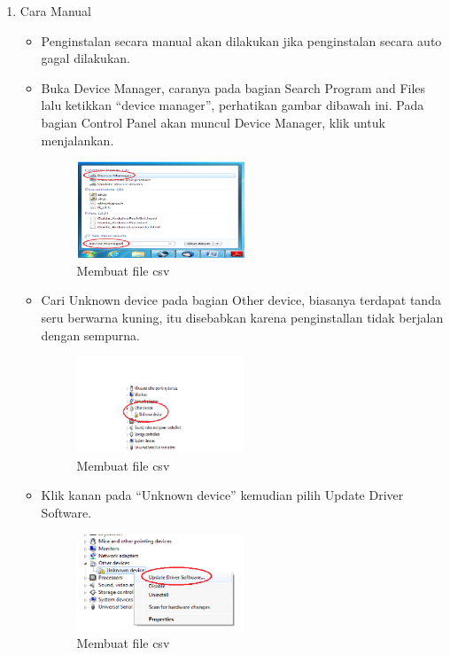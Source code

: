 \begin{enumerate}
    \item Cara Manual

    \begin{itemize}
        \item Penginstalan secara manual akan dilakukan jika penginstalan secara auto gagal dilakukan.
        \item Buka Device Manager, caranya pada bagian Search Program and Files lalu ketikkan “device manager”, perhatikan gambar dibawah ini. Pada bagian Control Panel akan muncul Device Manager, klik untuk menjalankan.
            \begin{figure}[H]	
                \includegraphics[width=5cm]{figures/5/1174070/teori/4.png}
                \centering
                \caption{Membuat file csv}
            \end{figure}

        \item Cari Unknown device pada bagian Other device, biasanya terdapat tanda seru berwarna kuning, itu disebabkan karena penginstallan tidak berjalan dengan sempurna.
        \begin{figure}[H]	
            \includegraphics[width=5cm]{figures/5/1174070/teori/5.png}
            \centering
            \caption{Membuat file csv}
        \end{figure}

        \item Klik kanan pada “Unknown device” kemudian pilih Update Driver Software.
        \begin{figure}[H]	
            \includegraphics[width=5cm]{figures/5/1174070/teori/6.png}
            \centering
            \caption{Membuat file csv}
        \end{figure}


\end{itemize}
\end{enumerate}
